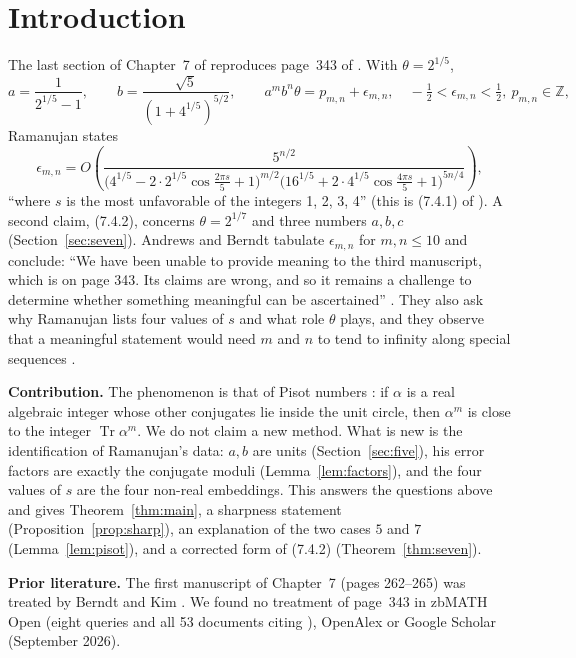 \documentclass[11pt]{article}
\theoremstyle{remark}
\newcommand{\Tr}{\operatorname{Tr}}
\newcommand{\Z}{\mathbb{Z}}
\begin{document}
\section{Introduction}
The last section of Chapter~7 of \cite{AB4} reproduces page~343 of \cite{LN}. With $\theta=2^{1/5}$,
\begin{equation}\label{eq:ab}
a=\frac1{2^{1/5}-1},\qquad b=\frac{\sqrt5}{(1+4^{1/5})^{5/2}},\qquad a^mb^n\theta=p_{m,n}+\epsilon_{m,n},\quad
-\tfrac12<\epsilon_{m,n}<\tfrac12,\ p_{m,n}\in\Z,
\end{equation}
Ramanujan states
\begin{equation}\label{eq:741}
\epsilon_{m,n}=O\!\left(\frac{5^{n/2}}{\bigl(4^{1/5}-2\cdot2^{1/5}\cos\frac{2\pi s}5+1\bigr)^{m/2}
\bigl(16^{1/5}+2\cdot4^{1/5}\cos\frac{4\pi s}5+1\bigr)^{5n/4}}\right),
\end{equation}
``where $s$ is the most unfavorable of the integers 1, 2, 3, 4'' (this is (7.4.1) of \cite{AB4}). A second claim, (7.4.2), concerns
$\theta=2^{1/7}$ and three numbers $a,b,c$ (Section~\ref{sec:seven}). Andrews and Berndt tabulate $\epsilon_{m,n}$ for $m,n\le10$ and
conclude: ``We have been unable to provide meaning to the third manuscript, which is on page 343. Its claims are wrong, and so it
remains a challenge to determine whether something meaningful can be ascertained'' \cite[p.~164]{AB4}. They also ask why
Ramanujan lists four values of $s$ and what role $\theta$ plays, and they observe that a meaningful statement would need $m$ and
$n$ to tend to infinity along special sequences \cite[p.~180]{AB4}.

\medskip\noindent\textbf{Contribution.} The phenomenon is that of Pisot numbers \cite{Thue,Hardy,Pisot,BDGPS}: if $\alpha$ is a real
algebraic integer whose other conjugates lie inside the unit circle, then $\alpha^m$ is close to the integer $\Tr\alpha^m$. We do not
claim a new method. What is new is the identification of Ramanujan's data: $a,b$ are units (Section~\ref{sec:five}), his error
factors are exactly the conjugate moduli (Lemma~\ref{lem:factors}), and the four values of $s$ are the four non-real embeddings.
This answers the questions above and gives Theorem~\ref{thm:main}, a sharpness statement (Proposition~\ref{prop:sharp}), an
explanation of the two cases $5$ and $7$ (Lemma~\ref{lem:pisot}), and a corrected form of (7.4.2) (Theorem~\ref{thm:seven}).

\medskip\noindent\textbf{Prior literature.} The first manuscript of Chapter~7 (pages 262--265) was treated by Berndt and Kim
\cite{BK}. We found no treatment of page~343 in zbMATH Open (eight queries and all 53 documents citing \cite{AB4}), OpenAlex or
Google Scholar (September 2026).
\end{document}
